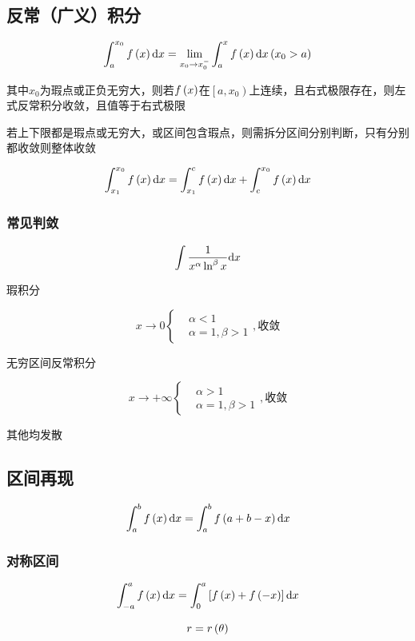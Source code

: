 \documentclass{article}
\begin{document}
\subsection{反常（广义）积分}

\[\int_a^{x_0}f\left(x\right)\mathrm d x=\lim_{x_0\to x_0^-}\int_a^x f\left(x\right)\mathrm d x\left(x_0>a\right)\]

其中$x_0$为瑕点或正负无穷大，则若$f\left(x\right)$在$\left[a,x_0\right)$上连续，且右式极限存在，则左式反常积分收敛，且值等于右式极限

若上下限都是瑕点或无穷大，或区间包含瑕点，则需拆分区间分别判断，只有分别都收敛则整体收敛

\[\int_{x_1}^{x_0}f\left(x\right)\mathrm d x=\int_{x_1}^cf\left(x\right)\mathrm d x+\int_c^{x_0}f\left(x\right)\mathrm d x\]

\subsubsection{常见判敛}

\[\int\frac1{x^\alpha\ln^\beta x}\mathrm d x\]

瑕积分

\[x\to0\left\{\begin{aligned}
         & \alpha<1         \\
         & \alpha=1,\beta>1
    \end{aligned}\right.,\text{收敛}\]

无穷区间反常积分

\[x\to+\infty\left\{\begin{aligned}
         & \alpha>1         \\
         & \alpha=1,\beta>1
    \end{aligned}\right.,\text{收敛}\]

其他均发散

\subsection{区间再现}

\[\int_a^bf\left(x\right)\mathrm d x=\int_a^bf\left(a+b-x\right)\mathrm d x\]

\subsubsection{对称区间}

\[\int_{-a}^af\left(x\right)\mathrm d x=\int_0^a\left[f\left(x\right)+f\left(-x\right)\right]\mathrm d x\]

\begin{definition}[以下极坐标方程中都有]
    \[r=r\left(\theta\right)\]
\end{definition}
\end{document}
